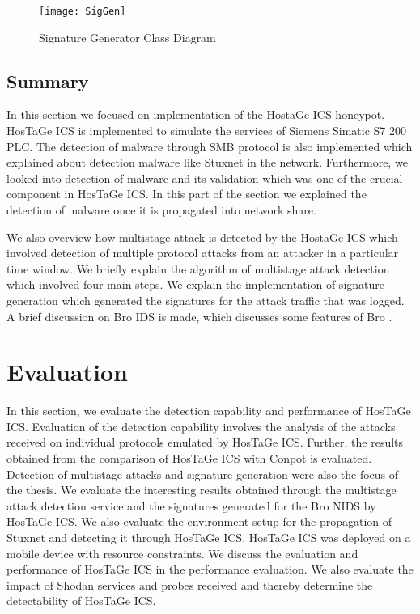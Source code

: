 \documentclass[article,msc=informatik,type=msc,colorback,accentcolor=tud9c]{tudthesis}
\begin{document}
	\newpage
	
		\begin{figure}[H]
					\centering
					\texttt{[image: SigGen]}
					\caption[Signature Generator Class Diagram]{\label{Signature Generator Class Diagram}Signature Generator Class Diagram}
					\end{figure}
			

	\subsection{Summary}
	In this section we focused on implementation of the HostaGe ICS honeypot. HosTaGe ICS is implemented to simulate the services of Siemens Simatic  S7 200 PLC. The detection of malware through \ac{SMB} protocol is also implemented which explained about detection malware like Stuxnet in the network.  Furthermore, we looked into detection of malware and its validation which was one of the crucial component in HosTaGe ICS. In this part of the section we explained the detection of malware once it is propagated into network share. 
	
	We also overview how multistage attack is detected by the HostaGe ICS which involved detection of multiple protocol attacks from an attacker in a particular time window. We briefly explain the algorithm of multistage attack detection which involved four main steps. We explain the implementation of signature generation which generated the signatures for the attack traffic that was logged. A brief discussion on Bro IDS is made, which discusses some features of Bro . 
	
	
	\newpage
 	\section{Evaluation} \label{Evaluation}
 		
 	In this section, we evaluate the detection capability and performance of HosTaGe ICS. Evaluation of the detection capability involves the analysis of the attacks received on individual protocols emulated by HosTaGe ICS. Further, the results obtained from the comparison of HosTaGe ICS with Conpot is evaluated. Detection of multistage attacks and signature generation were also the focus of the thesis. We evaluate the interesting results obtained through the multistage attack detection service and the signatures generated for the Bro \ac{NIDS} by HosTaGe ICS. We also evaluate the environment setup for the propagation of Stuxnet and detecting it through HosTaGe ICS. HosTaGe ICS was deployed on a mobile device with resource constraints. We discuss the evaluation and performance of HosTaGe ICS in the performance evaluation. We also evaluate the impact of Shodan services and probes received and thereby determine the detectability of HosTaGe ICS.
  
\end{document}

